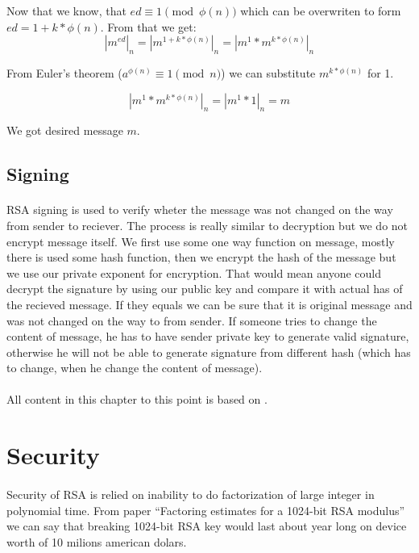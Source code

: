 \documentclass[thesis=B,english]{FITthesis}[2012/10/20]
\begin{document}
{{{Now that we know, that \(ed \equiv 1 \pmod{\phi(n)}\) which can be overwriten to form \(ed = 1 + k*\phi(n)\). From that we get:
\[| m^{ed}|_n = | m^{1+ k*\phi(n) }|_n = | m^1 * m^{ k*\phi(n)}|_n\]

From Euler's theorem (\(a^{\phi(n)} \equiv 1 \pmod{n}\)) we can substitute \(m^{ k*\phi(n)}\) for 1.


\[| m^1 * m^{ k*\phi(n)}|_n = | m^1 * 1|_n =  m\]

We got desired message \(m\). 
}

\subsection{Signing}
\paragraph*{}{
RSA signing is used to verify wheter the message was not changed on the way from sender to reciever. The process is really similar to decryption but we do not encrypt message itself. We first use some one way function on message, mostly there is used some hash function, then we encrypt the hash of the message but we use our private exponent for encryption. That would mean anyone could decrypt the signature by using our public key and compare it with actual has of the recieved message. If they equals we can be sure that it is original message and was not changed on the way to from sender. If someone tries to change the content of message, he has to have sender private key to generate valid signature, otherwise he will not be able to generate signature from different hash (which has to change, when he change the content of message).

}
\paragraph*{}{All content in this chapter to this point is based on \cite{RSA-math}.}
\section{Security}

\paragraph*{}{
Security of RSA is relied on inability to do factorization of large integer in polynomial time. From paper ``Factoring estimates for a 1024-bit RSA modulus''\cite{factor} we can say that breaking 1024-bit RSA key would last about year long on device worth of 10 milions american dolars.
}

}}
\end{document}
